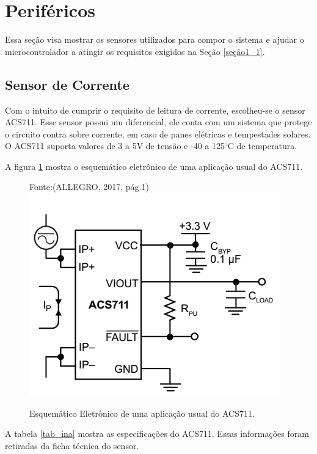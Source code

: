 \section{Periféricos}

	Essa seção visa mostrar os sensores utilizados para compor o sistema e ajudar o microcontrolador a atingir os requisitos exigidos na Seção \ref{seção1_1}.

\subsection{Sensor de Corrente}

Com o intuito de cumprir o requisito de leitura de corrente, escolheu-se o sensor ACS711. Esse sensor possui um diferencial, ele conta com um sistema que protege o circuito contra sobre corrente, em caso de panes elétricas e tempestades solares. O ACS711 suporta valores de 3 a 5V de tensão e -40 a 125$^{\circ}$C de temperatura.

A figura \ref{fig20} mostra o esquemático eletrônico de uma aplicação usual do ACS711.

\newpage

\begin{figure}[h]
	\centering
    Fonte:(ALLEGRO, 2017, pág.1)\linebreak
	\includegraphics[keepaspectratio=true,scale=0.8]{figuras/currentSensor.PNG}
	\caption{Esquemático Eletrônico de uma aplicação usual do ACS711.}
	\label{fig20}
\end{figure}

A tabela \ref{tab_ina} mostra as especificações do ACS711. Essas informações foram retiradas da ficha técnica do sensor.

